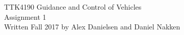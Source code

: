 \documentclass[a4paper]{article}
\begin{document}
\begin{titlepage}
\begin{center}
\Large TTK4190 Guidance and Control of Vehicles \\
\vspace{10pt}
\Large Assignment 1 \\
\vspace{10pt}
\large Written Fall 2017 by Alex Danielsen and Daniel Nakken
\end{center}
\end{titlepage}


 


\end{document}
